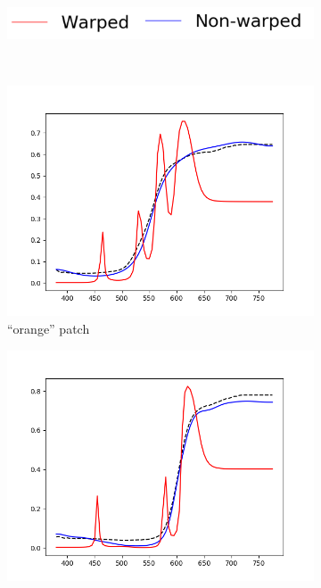\begin{figure}[t]
	\centering
	\captionsetup[subfigure]{font=footnotesize,labelfont=footnotesize}
	\captionsetup[subfigure]{justification=centering}
	\begin{subfigure}[t]{0.38\textwidth}
		\includegraphics[width=\linewidth]{img/resultsTechniqueOpt_legend.png}
	\end{subfigure} \\
	\begin{subfigure}[t]{0.32\textwidth}
		\includegraphics[width=\linewidth]{img/results_warping_orange.png}
		\caption{``orange'' patch}
		\label{fig:warping_alp_neutral50}
	\end{subfigure} \hspace{0.1em}
	\begin{subfigure}[t]{0.32\textwidth}
	\includegraphics[width=\linewidth]{img/results_warping_red.png}

\end{subfigure}
\end{figure}
